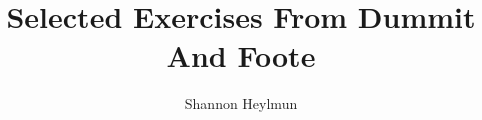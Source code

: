 \documentclass[a4paper,12pt]{book}
\begin{document}
\author{Shannon Heylmun}
\title{Selected Exercises From Dummit And Foote}
\frontmatter
\maketitle
\tableofcontents

\mainmatter
\setcounter{chapter}{-1}


\end{document}
